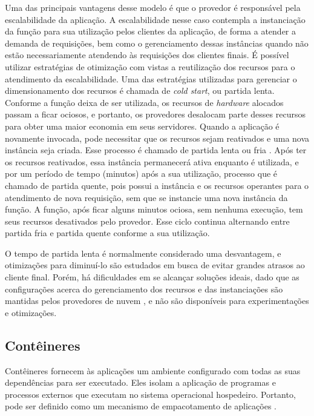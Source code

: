 \documentclass[conference]{IEEEtran}
\begin{document}
Uma das principais vantagens desse modelo é que o provedor é responsável pela escalabilidade da aplicação. A escalabilidade nesse caso contempla a instanciação da função para sua utilização pelos clientes da aplicação, de forma a atender a demanda de requisições, bem como o gerenciamento dessas instâncias quando não estão necessariamente atendendo às requisições dos clientes finais. É possível utilizar estratégias de otimização com vistas a reutilização dos recursos para o atendimento da escalabilidade.
Uma das estratégias utilizadas para gerenciar o dimensionamento dos recursos é chamada de \textit{cold start}, ou partida lenta. 
Conforme a função deixa de ser utilizada, os recursos de \textit{hardware} alocados passam a ficar ociosos, e portanto, os provedores desalocam parte desses recursos para obter uma maior economia em seus servidores. Quando a aplicação é novamente invocada, pode necessitar que os recursos sejam reativados e uma nova instância seja criada. Esse processo é chamado de partida lenta ou fria \cite{vahidinia_2020_cold_start}. Após ter os recursos reativados, essa instância permanecerá ativa enquanto é utilizada, e por um período de tempo (minutos) após a sua utilização, processo que é chamado de partida quente, pois possui a instância e os recursos operantes \cite{Raje_2023_cold_warm_start} para o atendimento de nova requisição, sem que se instancie uma nova instância da função. A função, após ficar alguns minutos ociosa, sem nenhuma execução, tem seus recursos desativados pelo provedor. Esse ciclo continua alternando entre partida fria e partida quente conforme a sua utilização.

O tempo de partida lenta é normalmente considerado uma desvantagem, e otimizações para diminuí-lo são estudados em busca de evitar grandes atrasos ao cliente final. Porém, há dificuldades em se alcançar soluções ideais, dado que as configurações acerca do gerenciamento dos recursos e das instanciações são mantidas pelos provedores de nuvem \cite{vahidinia_2020_cold_start, kumari_2022_mitigating_cold_start, vahidinia_2023_mitigating_cold_start, dantas_2022_reducing_cold_start}, e não são disponíveis para experimentações e otimizações.

\subsection{Contêineres}
\label{subsec:containers}

Contêineres fornecem às aplicações um ambiente configurado com todas as suas dependências para ser executado. Eles isolam a aplicação de programas e processos externos que executam no sistema operacional hospedeiro. Portanto, pode ser definido como um mecanismo de empacotamento de aplicações \cite{Siddiqui_2019_analysis_container}. 
\end{document}
